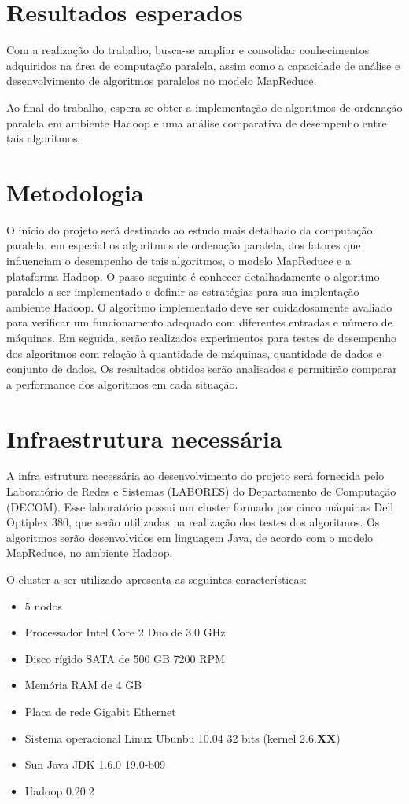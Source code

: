 \section{Resultados esperados}

Com a realização do trabalho, busca-se ampliar e consolidar conhecimentos adquiridos na área de computação paralela, assim como
a capacidade de análise e desenvolvimento de algoritmos paralelos no modelo MapReduce. 


Ao final do trabalho, espera-se obter a implementação de algoritmos de ordenação paralela em ambiente Hadoop e uma análise comparativa de desempenho entre tais algoritmos.

\section{Metodologia}

O início do projeto será destinado ao estudo mais detalhado da computação paralela, em especial os algoritmos de ordenação paralela, dos fatores que influenciam o desempenho de tais algoritmos, o modelo MapReduce e a plataforma Hadoop. O passo seguinte é conhecer detalhadamente o algoritmo paralelo a ser implementado e definir as estratégias para sua implentação ambiente Hadoop. 
O algoritmo implementado deve ser cuidadosamente avaliado para verificar um funcionamento adequado com diferentes entradas e número de máquinas. 
Em seguida, serão realizados experimentos para testes de desempenho dos algoritmos com relação à quantidade de máquinas, quantidade de dados e conjunto de dados.  Os resultados obtidos serão analisados e permitirão comparar a performance dos algoritmos em cada situação. 


\section{Infraestrutura necessária}

A infra estrutura necessária ao desenvolvimento do projeto será fornecida pelo Laboratório de Redes e Sistemas (LABORES) do Departamento de Computação (DECOM). Esse laboratório possui um cluster formado por cinco máquinas Dell Optiplex 380, que serão utilizadas na realização dos testes dos algoritmos. Os algoritmos serão desenvolvidos em linguagem Java, de acordo com o modelo MapReduce, no ambiente Hadoop. 

O cluster a ser utilizado apresenta as seguintes características:
\begin{itemize}
\item 5 nodos
\item Processador Intel Core 2 Duo de 3.0 GHz
\item Disco rígido SATA de 500 GB 7200 RPM
\item Memória RAM de 4 GB
\item Placa de rede Gigabit Ethernet
\item Sistema operacional Linux Ubunbu 10.04 32 bits (kernel 2.6.\textbf{XX})
\item Sun Java JDK 1.6.0 19.0-b09 
\item Hadoop 0.20.2
\end{itemize}

